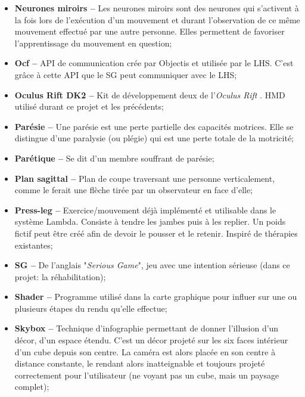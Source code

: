 \begin{itemize}
	\item \textbf{Neurones miroirs --}  Les neurones miroirs sont des neurones qui s'activent à la fois lors de l'exécution d'un mouvement et durant l'observation de ce même mouvement effectué par une autre personne. Elles permettent de favoriser l'apprentissage du mouvement en question;
	
	\item \textbf{Ocf --} API de communication crée par Objectis \cite{OcfClient_website} et utilisée par le LHS. C'est grâce à cette API que le SG peut communiquer avec le LHS;
	
	\item \textbf{Oculus Rift DK2 --} Kit de développement deux de l'\textit{Oculus Rift} \cite{OculusDk2_website}. HMD utilisé durant ce projet et les précédents;
	
	\item \textbf{Parésie --} Une parésie est une perte partielle des capacités motrices. Elle se distingue d'une paralysie (ou plégie) qui est une perte totale de la motricité;
	
	\item \textbf{Parétique --} Se dit d'un membre souffrant de parésie;
	
	\item \textbf{Plan sagittal --} Plan de coupe traversant une personne verticalement, comme le ferait une flèche tirée par un observateur en face d'elle;
	
	\item \textbf{Press-leg --} Exercice/mouvement déjà implémenté et utilisable dans le système Lambda. Consiste à tendre les jambes puis à les replier. Un poids fictif peut être créé afin de devoir le pousser et le retenir. Inspiré de thérapies existantes;
	
	\item \textbf{SG --} De l'anglais "\textit{Serious Game}", jeu avec une intention sérieuse (dans ce projet: la réhabilitation);
	
	\item \textbf{Shader --} Programme utilisé dans la carte graphique pour influer sur une ou plusieurs étapes du rendu qu'elle effectue;
	
	\item \textbf{Skybox --} Technique d'infographie permettant de donner l'illusion d'un décor, d'un espace étendu. C'est un décor projeté sur les six faces intérieur d'un cube depuis son centre. La caméra est alors placée en son centre à distance constante, le rendant alors inatteignable et toujours projeté correctement pour l'utilisateur (ne voyant pas un cube, mais un paysage complet);
	

\end{itemize}
